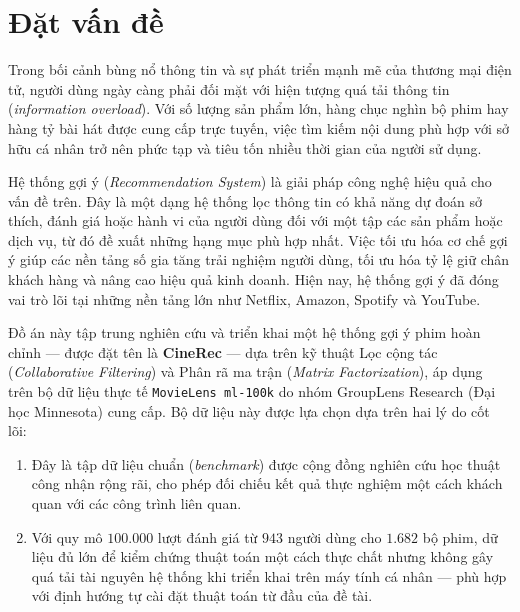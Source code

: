 \documentclass[../BTL.tex]{subfiles}
\begin{document}
\section{Đặt vấn đề}
\label{section:1.1}
Trong bối cảnh bùng nổ thông tin và sự phát triển mạnh mẽ của thương mại điện tử, người dùng ngày càng phải đối mặt với hiện tượng quá tải thông tin (\textit{information overload}). Với số lượng sản phẩm lớn, hàng chục nghìn bộ phim hay hàng tỷ bài hát được cung cấp trực tuyến, việc tìm kiếm nội dung phù hợp với sở hữu cá nhân trở nên phức tạp và tiêu tốn nhiều thời gian của người sử dụng.

Hệ thống gợi ý (\textit{Recommendation System}) là giải pháp công nghệ hiệu quả cho vấn đề trên. Đây là một dạng hệ thống lọc thông tin có khả năng dự đoán sở thích, đánh giá hoặc hành vi của người dùng đối với một tập các sản phẩm hoặc dịch vụ, từ đó đề xuất những hạng mục phù hợp nhất. Việc tối ưu hóa cơ chế gợi ý giúp các nền tảng số gia tăng trải nghiệm người dùng, tối ưu hóa tỷ lệ giữ chân khách hàng và nâng cao hiệu quả kinh doanh. Hiện nay, hệ thống gợi ý đã đóng vai trò lõi tại những nền tảng lớn như Netflix, Amazon, Spotify và YouTube.

Đồ án này tập trung nghiên cứu và triển khai một hệ thống gợi ý phim hoàn chỉnh — được đặt tên là \textbf{CineRec} — dựa trên kỹ thuật Lọc cộng tác (\textit{Collaborative Filtering}) và Phân rã ma trận (\textit{Matrix Factorization}), áp dụng trên bộ dữ liệu thực tế \texttt{MovieLens ml-100k} do nhóm GroupLens Research (Đại học Minnesota) cung cấp. Bộ dữ liệu này được lựa chọn dựa trên hai lý do cốt lõi:

\begin{enumerate}
    \item Đây là tập dữ liệu chuẩn (\textit{benchmark}) được cộng đồng nghiên cứu học thuật công nhận rộng rãi, cho phép đối chiếu kết quả thực nghiệm một cách khách quan với các công trình liên quan.
    \item Với quy mô $100.000$ lượt đánh giá từ $943$ người dùng cho $1.682$ bộ phim, dữ liệu đủ lớn để kiểm chứng thuật toán một cách thực chất nhưng không gây quá tải tài nguyên hệ thống khi triển khai trên máy tính cá nhân — phù hợp với định hướng tự cài đặt thuật toán từ đầu của đề tài.
\end{enumerate}
\end{document}
